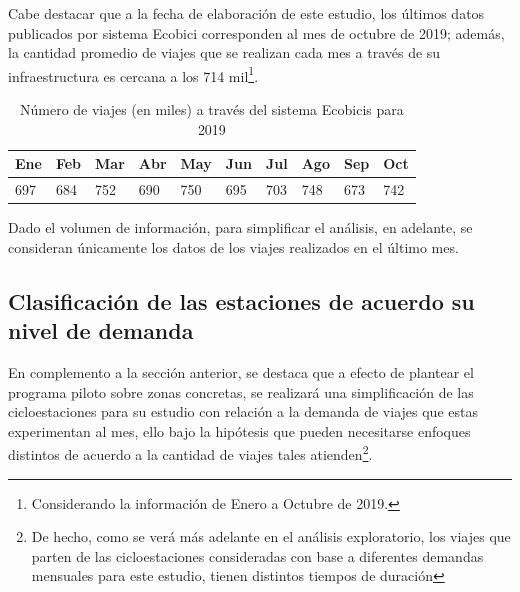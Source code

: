 \documentclass[9pt,twocolumn,twoside]{ilcss}
\begin{document}
Cabe destacar que a la fecha de elaboración de este estudio, los últimos datos publicados por sistema Ecobici corresponden al mes de octubre de 2019; además, la cantidad promedio de viajes que se realizan cada mes a través de su infraestructura es cercana a los 714 mil\footnote{Considerando la información de Enero a Octubre de 2019.}. 

\begin{table}[tbhp]
	\centering
	\caption{Número de viajes (en miles) a través del sistema Ecobicis para 2019}
	\label{tab:ecobicis2019}
	\begin{tabular}{@{}llllllllll@{}}
		\toprule
		Ene & Feb & Mar & Abr & May & Jun & Jul & Ago & Sep & Oct \\ \midrule
		697 & 684 & 752 & 690 & 750 & 695 & 703 & 748 & 673 & 742 \\ \bottomrule
	\end{tabular}
\end{table}

Dado el volumen de información, para simplificar el análisis, en adelante, se consideran únicamente los datos de los viajes realizados en el último mes.

\subsection{Clasificación de las estaciones de acuerdo su nivel de demanda} 

En complemento a la sección anterior, se destaca que a efecto de plantear el programa piloto sobre zonas concretas, se realizará una simplificación de las cicloestaciones para su estudio con relación a la demanda de viajes que estas experimentan al mes, ello bajo la hipótesis que pueden necesitarse enfoques distintos de acuerdo a la cantidad de viajes tales atienden\footnote{De hecho, como se verá más adelante en el análisis exploratorio, los viajes que parten de las cicloestaciones consideradas con base a diferentes demandas mensuales para este estudio, tienen distintos tiempos de duración}. 



\end{document}
